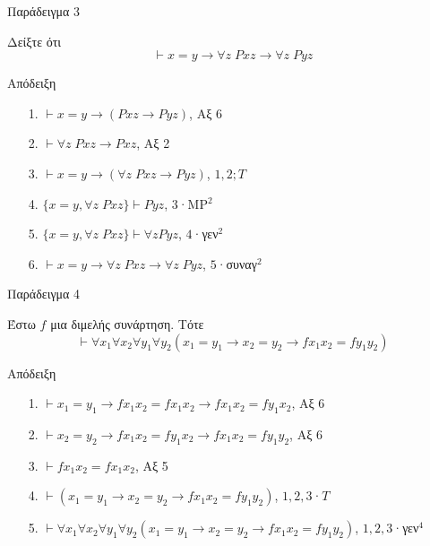 \documentclass{beamer}
\begin{document}
\begin{frame}{Παράδειγμα 3}
  \begin{block}{}
  Δείξτε ότι
    \[
      \vdash x = y \rightarrow \forall z \; Pxz \rightarrow \forall z \; Pyz
    \]
  \end{block}
  \begin{block}{Απόδειξη}
    \begin{itemize}
      \item[1.] $\vdash x = y \rightarrow (Pxz \rightarrow Pyz)$, Αξ 6
      \item[2.] $\vdash \forall z \; Pxz \rightarrow Pxz$, Αξ 2
      \item[3.] $\vdash x = y \rightarrow (\forall z \; Pxz \rightarrow Pyz)$, $1,2;T$
      \item[4.] $\{x = y, \forall z \; Pxz\} \vdash Pyz$, $3$·MP$^2$
      \item[5.] $\{x = y, \forall z \; Pxz\} \vdash \forall z Pyz$, $4$·γεν$^2$
      \item[6.] $\vdash x = y \rightarrow \forall z \; Pxz \rightarrow \forall z \; Pyz$, $5$·συναγ$^2$
    \end{itemize}
  \end{block}
\end{frame}

\begin{frame}{Παράδειγμα 4}
  \begin{block}{}
  Έστω $f$ μια διμελής συνάρτηση. Τότε
    \[
      \vdash \forall x_1 \forall x_2 \forall y_1 \forall y_2 (x_1 = y_1 \rightarrow x_2 = y_2 \rightarrow fx_1x_2 = fy_1y_2)
    \]
  \end{block}
  \begin{block}{Απόδειξη}
    \begin{itemize}
      \item[1.] $\vdash x_1 = y_1 \rightarrow fx_1x_2 = fx_1x_2 \rightarrow fx_1x_2 = fy_1x_2$, Αξ 6
      \item[2.] $\vdash x_2 = y_2 \rightarrow fx_1x_2 = fy_1x_2 \rightarrow fx_1x_2 = fy_1y_2$, Αξ 6
      \item[3.] $\vdash fx_1x_2 = fx_1x_2$, Αξ 5
      \item[4.] $\vdash (x_1 = y_1 \rightarrow x_2 = y_2 \rightarrow fx_1x_2 = fy_1y_2)$, $1,2,3$·$T$
      \item[5.] $\vdash \forall x_1 \forall x_2 \forall y_1 \forall y_2 (x_1 = y_1 \rightarrow x_2 = y_2 \rightarrow fx_1x_2 = fy_1y_2)$, $1,2,3$·γεν$^4$
    \end{itemize}
  \end{block}
\end{frame}
\end{document}
